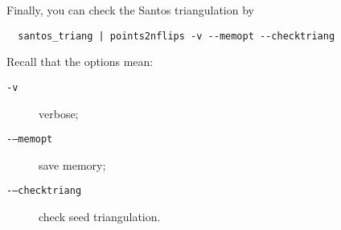 \documentclass[12pt,a4paper]{article}
\begin{document}
Finally, you can check the Santos triangulation by

\begin{verbatim}
  santos_triang | points2nflips -v --memopt --checktriang
\end{verbatim}

Recall that the options mean:

\begin{description}
\item[\texttt{-v}] verbose;
\item[\texttt{-}\texttt{--memopt}] save memory;
\item[\texttt{-}\texttt{--checktriang}] check seed triangulation.
\end{description}
\end{document}
